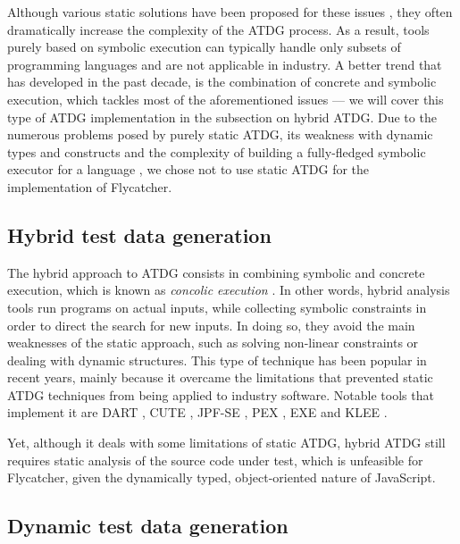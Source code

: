 \documentclass[a4paper,11pt,titlepage]{report}
\begin{document}
Although various static solutions have been proposed for these issues \cite{ramamoorthy1976automated,goldberg1994applications,offutt1999dynamic}, they often dramatically increase the complexity of the ATDG process. As a result, tools purely based on symbolic execution can typically handle only subsets of programming languages and are not applicable in industry. A better trend that has developed in the past decade, is the combination of concrete and symbolic execution, which tackles most of the aforementioned issues \cite{păsăreanu2009survey} --- we will cover this type of ATDG implementation in the subsection on hybrid ATDG. Due to the numerous problems posed by purely static ATDG, its weakness with dynamic types and constructs \cite{edvardsson1999survey,tahbildar2automated} and the complexity of building a fully-fledged symbolic executor for a language \cite{edvardsson1999survey,han2008empirical}, we chose not to use static ATDG for the implementation of Flycatcher.

\subsection{Hybrid test data generation}

The hybrid approach to ATDG consists in combining symbolic and concrete execution, which is known as \emph{concolic execution} \cite{păsăreanu2009survey}. In other words, hybrid analysis tools run programs on actual inputs, while collecting symbolic constraints in order to direct the search for new inputs. In doing so, they avoid the main weaknesses of the static approach, such as solving non-linear constraints or dealing with dynamic structures. This type of technique has been popular in recent years, mainly because it overcame the limitations that prevented static ATDG techniques from being applied to industry software. Notable tools that implement it are DART \cite{godefroid2005dart}, CUTE \cite{sen2005cute}, JPF-SE \cite{anand2007jpf}, PEX \cite{tillmann2008pex}, EXE \cite{cadar2008exe} and KLEE \cite{cadar2008klee}.

Yet, although it deals with some limitations of static ATDG, hybrid ATDG still requires static analysis of the source code under test, which is unfeasible for Flycatcher, given the dynamically typed, object-oriented nature of JavaScript.

\subsection{Dynamic test data generation}
\end{document}
